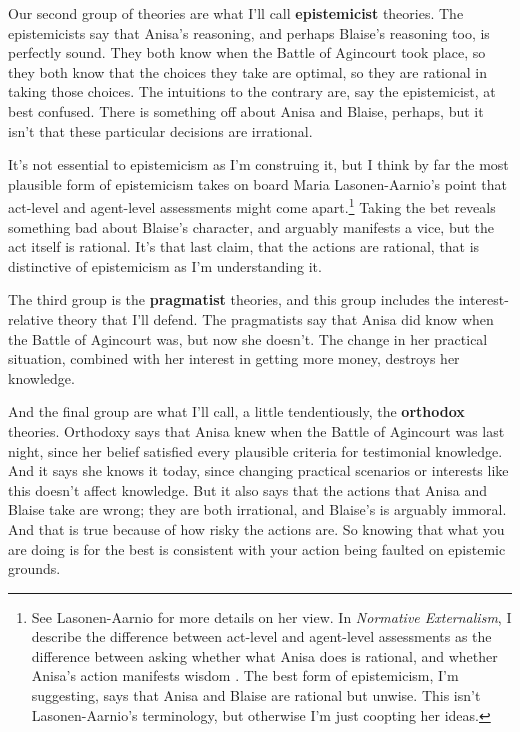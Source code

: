 \documentclass[11pt,]{book}
\let\rmarkdownfootnote\footnote%
\def\footnote{\protect\rmarkdownfootnote}
\begin{document}
Our second group of theories are what I'll call \textbf{epistemicist} theories. The epistemicists say that Anisa's reasoning, and perhaps Blaise's reasoning too, is perfectly sound. They both know when the Battle of Agincourt took place, so they both know that the choices they take are optimal, so they are rational in taking those choices. The intuitions to the contrary are, say the epistemicist, at best confused. There is something off about Anisa and Blaise, perhaps, but it isn't that these particular decisions are irrational.

It's not essential to epistemicism as I'm construing it, but I think by far the most plausible form of epistemicism takes on board Maria Lasonen-Aarnio's point that act-level and agent-level assessments might come apart.\footnote{See Lasonen-Aarnio \citetext{\citeyear{Lasonen-Aarnio2010b}; \citeyear{Lasonen-Aarnio2014}} for more details on her view. In \emph{Normative Externalism}, I describe the difference between act-level and agent-level assessments as the difference between asking whether what Anisa does is rational, and whether Anisa's action manifests wisdom \citep[124-5]{Weatherson2019}. The best form of epistemicism, I'm suggesting, says that Anisa and Blaise are rational but unwise. This isn't Lasonen-Aarnio's terminology, but otherwise I'm just coopting her ideas.} Taking the bet reveals something bad about Blaise's character, and arguably manifests a vice, but the act itself is rational. It's that last claim, that the actions are rational, that is distinctive of epistemicism as I'm understanding it.

The third group is the \textbf{pragmatist} theories, and this group includes the interest-relative theory that I'll defend. The pragmatists say that Anisa did know when the Battle of Agincourt was, but now she doesn't. The change in her practical situation, combined with her interest in getting more money, destroys her knowledge.

And the final group are what I'll call, a little tendentiously, the \textbf{orthodox} theories. Orthodoxy says that Anisa knew when the Battle of Agincourt was last night, since her belief satisfied every plausible criteria for testimonial knowledge. And it says she knows it today, since changing practical scenarios or interests like this doesn't affect knowledge. But it also says that the actions that Anisa and Blaise take are wrong; they are both irrational, and Blaise's is arguably immoral. And that is true because of how risky the actions are. So knowing that what you are doing is for the best is consistent with your action being faulted on epistemic grounds.
\end{document}
